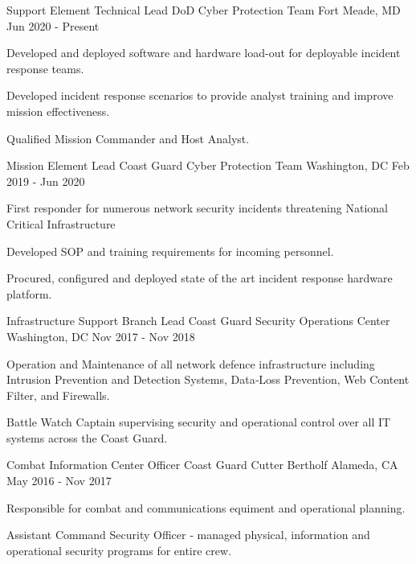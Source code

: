\documentclass[11pt, letterpaper]{awesome-cv}
\begin{document}
\begin{cventries}


  \cventry
    {Support Element Technical Lead}
    {DoD Cyber Protection Team}
    {Fort Meade, MD}
    {Jun 2020 - Present}
    {
      \begin{cvitems}
        \item{Developed and deployed software and hardware load-out for deployable incident response teams.}
        \item{Developed incident response scenarios to provide analyst training and improve mission effectiveness.}
        \item{Qualified Mission Commander and Host Analyst.}
      \end{cvitems}
    }


  \cventry
    {Mission Element Lead}
    {Coast Guard Cyber Protection Team}
    {Washington, DC}
    {Feb 2019 - Jun 2020}
    {
      \begin{cvitems}
        \item{First responder for numerous network security incidents threatening National Critical Infrastructure}
        \item{Developed SOP and training requirements for incoming personnel.}
        \item{Procured, configured and deployed state of the art incident response hardware platform.}
      \end{cvitems}
    }


  \cventry
    {Infrastructure Support Branch Lead}
    {Coast Guard Security Operations Center}
    {Washington, DC}
    {Nov 2017 - Nov 2018}
    {
      \begin{cvitems}
        \item{Operation and Maintenance of all network defence infrastructure including Intrusion Prevention and Detection Systems, Data‑Loss Prevention, Web Content Filter, and Firewalls.}
        \item{Battle Watch Captain supervising security and operational control over all IT systems across the Coast Guard.}
      \end{cvitems}
    }


  \cventry
    {Combat Information Center Officer}
    {Coast Guard Cutter Bertholf}
    {Alameda, CA}
    {May 2016 - Nov 2017}
    {
      \begin{cvitems}
        \item{Responsible for combat and communications equiment and operational planning.}
        \item{Assistant Command Security Officer ‑ managed physical, information and operational security programs for entire crew.}
      \end{cvitems}
    }



\end{cventries}
\end{document}
